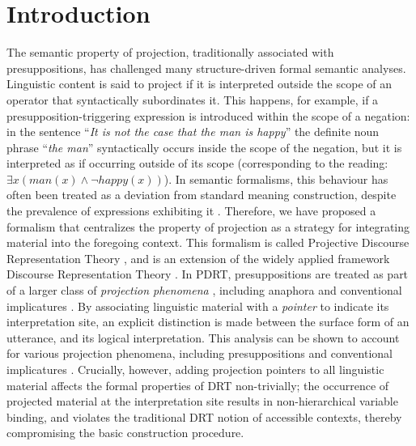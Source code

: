 \section{Introduction}\label{sec:introduction}

The semantic property of projection, traditionally associated with
presuppositions, has challenged many structure-driven formal semantic
analyses. Linguistic content is said to project if it is interpreted outside
the scope of an operator that syntactically subordinates it. This happens,
for example, if a presupposition-triggering expression is introduced within
the scope of a negation: in the sentence ``\textit{It is not the case that
the man is happy}'' the definite noun phrase ``\textit{the man}''
syntactically occurs inside the scope of the negation, but it is interpreted
as if occurring outside of its scope (corresponding to the reading: $\exists
x(man(x) \wedge \neg happy(x))$). In semantic formalisms, this behaviour has
often been treated as a deviation from standard meaning construction,
despite the prevalence of expressions exhibiting it
.  Therefore, we have proposed a formalism that centralizes the
property of projection as a strategy for integrating material into the
foregoing context. This formalism is called Projective Discourse
Representation Theory , and is an
extension of the widely applied framework Discourse Representation Theory
\cite{kamp1981theory,kamp1993discourse}. In PDRT, presuppositions are
treated as part of a larger class of \textit{projection phenomena}
, including anaphora and conventional
implicatures . By associating linguistic
material with a \textit{pointer} to indicate its interpretation site, an
explicit distinction is made between the surface form of an utterance, and
its logical interpretation. This analysis can be shown to account for
various projection phenomena, including presuppositions
\cite{venhuizen2013iwcs} and conventional implicatures
\cite{venhuizen2014salt}. Crucially, however, adding projection
pointers to all linguistic material affects the formal properties of DRT
non-trivially; the occurrence of projected material at the interpretation
site results in non-hierarchical variable binding, and violates the
traditional DRT notion of accessible contexts, thereby compromising the
basic construction procedure.

